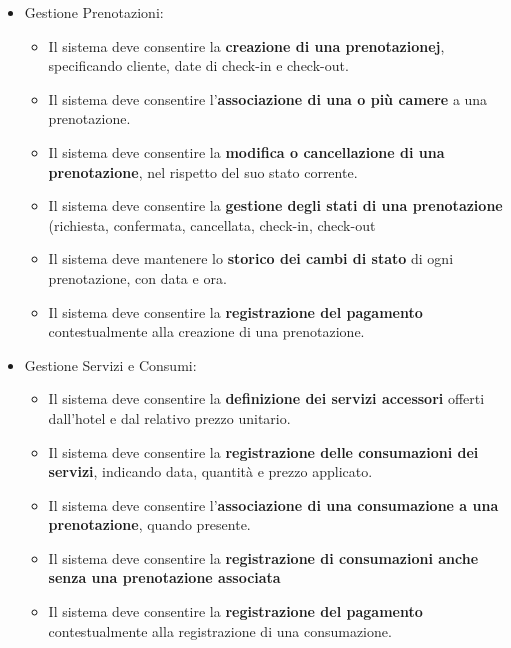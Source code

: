 \documentclass[a4paper,12pt]{report}
\begin{document}
\begin{itemize}
\begin{itemize}
              \item  Il sistema deve consentire la \textbf{creazione, modifica e consultazione delle tipologie di camera}, specificandone le caratteristiche principali.
              \item Il sistema deve consentire \textbf{l'inserimento e la gestione delle singole camere}, assiociandole a una tipologia.
              \item Il sistema deve consentire l'\textbf{aggiornamento e la gestione dello stato di una camera} (disponibile, occupata, in manutenzione).
          \end{itemize}
    \item Gestione Prenotazioni:
          \begin{itemize}
              \item Il sistema deve consentire la \textbf{creazione di una prenotazionej}, specificando cliente, date di check-in e check-out.
              \item Il sistema deve consentire l'\textbf{associazione di una o più camere} a una prenotazione.
              \item Il sistema deve consentire la \textbf{modifica o cancellazione di una prenotazione}, nel rispetto del suo stato corrente.
              \item Il sistema deve consentire la \textbf{ gestione degli stati di una prenotazione} (richiesta, confermata, cancellata, check-in, check-out
              \item Il sistema deve mantenere lo \textbf{storico dei cambi di stato} di ogni prenotazione, con data e ora.
              \item Il sistema deve consentire la \textbf{registrazione del pagamento} contestualmente alla creazione di una prenotazione.
          \end{itemize}
    \item Gestione Servizi e Consumi:
          \begin{itemize}
              \item Il sistema deve consentire la \textbf{definizione dei servizi accessori} offerti dall'hotel e dal relativo prezzo unitario.
              \item Il sistema deve consentire la \textbf{registrazione delle consumazioni dei servizi}, indicando data, quantità e prezzo applicato.
              \item Il sistema deve consentire l'\textbf{associazione di una consumazione a una prenotazione}, quando presente.
              \item Il sistema deve consentire la \textbf{registrazione di consumazioni anche senza una prenotazione associata}
              \item Il sistema deve consentire la \textbf{registrazione del pagamento} contestualmente alla registrazione di una consumazione.
          \end{itemize}


\end{itemize}
\end{document}
